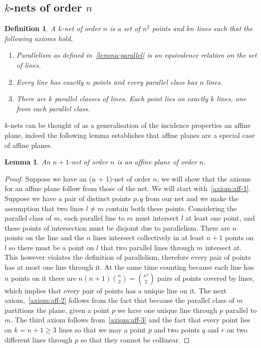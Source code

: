 \documentclass{article}
\newtheorem{lemma}{Lemma}
\newtheorem{definition}{Definition}
\begin{document}
\subsection{\(k\)-nets of order \(n\)}

\begin{definition}

    A \(k\)-net of order \(n\) is a set of \(n^{2}\) points and \(kn\) lines such that the following axioms hold,

    \begin{enumerate}
    \item Parallelism as defined in~\ref{lemma:parallel} is an equivalence relation on the set of lines.
    \item Every line has exactly \(n\) points and every parallel class has \(n\) lines.
            \item There are \(k\) parallel classes of lines. Each point lies on exactly \(k\) lines, one from each parallel class.
    \end{enumerate}
\end{definition}

\(k\)-nets can be thought of as a generalisation of the incidence properties an affine plane, indeed the following lemma establishes that affine planes are a special case of affine planes.

\begin{lemma}
An \(n + 1\)-net of order \(n\) is an affine plane of order \(n\).
\end{lemma}

\begin{proof}
  Suppose we have an (n + 1)-net of order \(n\), we will show that the axioms for an affine plane follow from those of the net. We will start with~\ref{axiom:aff-1}. Suppose we have a pair of distinct points \(p, q\) from our net and we make the assumption that two lines \(l \ne m\) contain both these points. Considering the parallel class of \(m\), each parallel line to \(m\) must intersect \(l\) at least one point, and these points of intersection must be disjoint due to parallelism. There are \(n\) points on the line and the \(n\) lines intersect collectively in at least \(n + 1\) points on \(l\) so there must be a point on \(l\) that two parallel lines through \(m\) intersect at. This however violates the definition of parallelism, therefore every pair of points has at most one line through it. At the same time counting because each line has \(n\) points on it there are \(n(n + 1)\binom{n}{2} = \binom{n^{2}}{2}\) pairs of points covered by lines, which implies that every pair of points has a unique line on it.
  The next axiom,~\ref{axiom:aff-2} follows from the fact that because the parallel class of \(m\) partitions the plane, given a point \(p\) we have one unique line through \(p\) parallel to \(m\). The third axiom follows from~\ref{axiom:aff-3} and the fact that every point lies on \(k = n + 1 \geq 3\) lines so that we may a point \(p\) and two points \(q\) and \(r\) on two different lines through \(p\) so that they cannot be collinear.
\end{proof}
\end{document}
